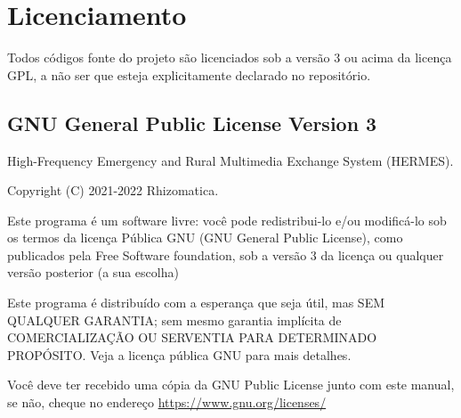 \documentclass[11pt,a4paper]{article}
\begin{document}
\section{Licenciamento}
\label{apx_license}
Todos códigos fonte do projeto são licenciados sob a versão 3 ou acima da licença GPL, a não ser que esteja explicitamente declarado no repositório.


\subsection{GNU General Public License Version 3}

    High-Frequency Emergency and Rural Multimedia Exchange System (HERMES).

    Copyright (C) 2021-2022 Rhizomatica.
\newline

Este programa é um software livre: você pode redistribui-lo e/ou modificá-lo sob os termos da licença Pública GNU (GNU General Public License), como publicados pela Free Software foundation, sob a versão 3 da licença ou qualquer versão posterior (a sua escolha)

Este programa é distribuído com a esperança que seja útil, mas SEM QUALQUER GARANTIA; sem mesmo garantia implícita de COMERCIALIZAÇÃO OU SERVENTIA PARA DETERMINADO PROPÓSITO. Veja a licença pública GNU para mais detalhes. 



Você deve ter recebido uma cópia da GNU Public License junto com este manual, se não, cheque no endereço \url{https://www.gnu.org/licenses/}

  
    
\end{document}
